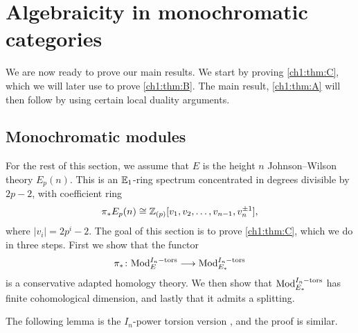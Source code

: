 
\section{\hspace{-2pt}Algebraicity in monochromatic categories}

We are now ready to prove our main results. We start by proving \cref{ch1:thm:C}, which we will later use to prove \cref{ch1:thm:B}. The main result, \cref{ch1:thm:A} will then follow by using certain local duality arguments. 

\subsection{Monochromatic modules}
\label{ch1:ssec:algebraicity-modules}

For the rest of this section, we assume that $E$ is the height $n$ Johnson--Wilson theory $E_p(n)$. This is an $\mathbb{E}_1$-ring spectrum concentrated in degrees divisible by $2p-2$, with coefficient ring 
\[\pi_* E_p(n) \cong \mathbb{Z}_{(p)}[v_1, v_2, \ldots, v_{n-1}, v_n^{\pm 1}],\] 
where $|v_i| = 2p^i-2$. The goal of this section is to prove \cref{ch1:thm:C}, which we do in three steps. First we show that the functor 
\[\pi_*\colon \mathrm{Mod}_{E}^{I_n-\mathrm{tors}} \longrightarrow \mathrm{Mod}_{E_*}^{I_n-\mathrm{tors}}\] 
is a conservative adapted homology theory. We then show that $\mathrm{Mod}_{E_*}^{I_n-\mathrm{tors}}$ has finite cohomological dimension, and lastly that it admits a splitting. 

The following lemma is the $I_n$-power torsion version \cite[3.14]{barthel-frankland_15}, and the proof is similar.

